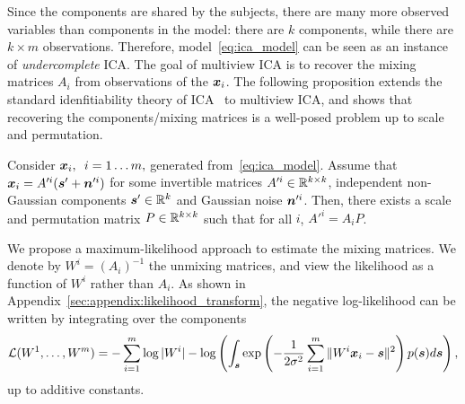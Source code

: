 Since the components are shared by the subjects, there are many more observed variables than components in the model: there are $k$ components, while there are $k \times m$ observations.
%
Therefore, model~\eqref{eq:ica_model} can be seen as an instance of \emph{undercomplete} ICA.
%
The goal of multiview ICA is to recover the mixing matrices $A_i$ from observations of the $\boldsymbol{x}_i$.
%
The following proposition extends the standard idenfitiability theory of ICA~\cite{comon1994independent} to multiview ICA, and shows that recovering the components/mixing matrices is a well-posed problem up to scale and permutation.
%
\begin{proposition}
\label{prop:identifiability}
Consider $\boldsymbol{x}_i, \enspace i=1\dots m,$ generated from~\eqref{eq:ica_model}. Assume that $\boldsymbol{x}_i = A'^i(\boldsymbol{s}' + \boldsymbol{n}'^i)$ for some invertible matrices $A'^i\in \mathbb{R}^{k\times k}$, independent non-Gaussian components $\boldsymbol{s}'\in \mathbb{R}^k$ and Gaussian noise $\boldsymbol{n}'^i$. Then, there exists a scale and permutation matrix $P\in \mathbb{R}^{k\times k}$ such that for all $i$, $A'^i = A_i P$.
\end{proposition}
%
%
%
%
%
%
%
We propose a maximum-likelihood approach to estimate the mixing matrices. 
We denote by $W^i = (A_i)^{-1}$ the unmixing matrices, and view the likelihood as a function of $W^i$ rather than $A_i$. As shown in Appendix~\ref{sec:appendix:likelihood_transform}, the negative log-likelihood can be written by integrating over the components
\begin{equation} 
    \label{eq:likelihood}
    \mathcal{L}(W^1, \dots, W^m) = -\sum_{i=1}^m\log|W^i| - \log\left(\int_{\boldsymbol{s}}\exp\left(-\frac1{2\sigma^2}\sum_{i=1}^m\|W^i\boldsymbol{x}_i - \boldsymbol{s}\|^2\right)p(\boldsymbol{s})d\boldsymbol{s}\right),
\end{equation}
up to additive constants.
